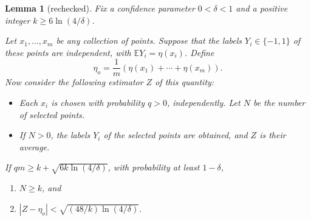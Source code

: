 \documentclass{article}
\def\E{{\mathbb E}}
\newtheorem{lemma}[thm]{Lemma}
\begin{document}
\begin{lemma}[rechecked]
Fix a confidence parameter $0 < \delta < 1$ and a positive integer $k \geq 6 \ln (4/\delta)$. 

Let $x_1, \ldots, x_m$ be any collection of points. Suppose that the labels $Y_i \in \{-1,1\}$ of these points are independent, with $\E Y_i = \eta(x_i)$. Define
$$ \eta_o = \frac{1}{m} \left( \eta(x_1) + \cdots + \eta(x_m) \right) .$$
Now consider the following estimator $Z$ of this quantity:
\begin{itemize}
\item Each $x_i$ is chosen with probability $q > 0$, independently. Let $N$ be the number of selected points.
\item If $N > 0$, the labels $Y_i$ of the selected points are obtained, and $Z$ is their average.
\end{itemize}
If $qm \geq k + \sqrt{6k \ln (4/\delta)}$, with probability at least $1-\delta$, 
\begin{enumerate}
\item[(a)] $N \geq k$, and 
\item[(b)] $| Z - \eta_o| < \sqrt{(48/k) \ln (4/\delta)}$.
\end{enumerate}
\label{lemma:large-deviation-discrete}
\end{lemma}
\end{document}
